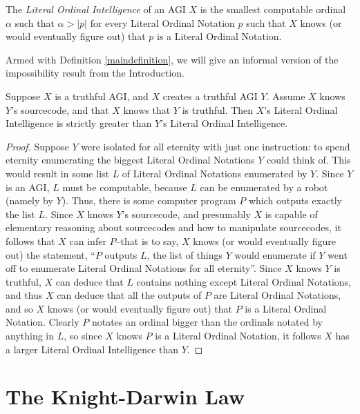 \documentclass[runningheads]{llncs}
\begin{document}
\begin{definition}
\label{maindefinition}
    The \emph{Literal Ordinal Intelligence} of an AGI $X$ is the smallest computable
    ordinal $\alpha$ such that $\alpha>|p|$ for every Literal Ordinal Notation
    $p$ such that $X$ knows (or would eventually figure out) that $p$ is a
    Literal Ordinal Notation.
\end{definition}

Armed with Definition \ref{maindefinition}, we will give an informal version of the
impossibility result from the Introduction.

\begin{theorem}
\label{maintheorem}
    Suppose $X$ is a truthful AGI, and $X$ creates a truthful AGI $Y$.
    Assume $X$ knows $Y$'s sourcecode, and that $X$ knows that $Y$ is truthful.
    Then $X$'s Literal Ordinal Intelligence is strictly greater than $Y$'s
    Literal Ordinal Intelligence.
\end{theorem}

\begin{proof}
    Suppose $Y$ were isolated for all eternity with just one instruction:
    to spend eternity enumerating the biggest Literal Ordinal Notations $Y$ could
    think of. This would result in some list $L$ of Literal Ordinal Notations
    enumerated by $Y$. Since $Y$ is an AGI, $L$ must be computable, because $L$ can
    be enumerated by a robot (namely by $Y$). Thus, there is some computer program
    $P$ which outputs exactly the list $L$. Since $X$ knows $Y$'s sourcecode,
    and presumably $X$ is capable of elementary reasoning about sourcecodes and
    how to manipulate sourcecodes, it follows that $X$ can infer $P$--that is to
    say, $X$ knows (or would eventually figure out) the statement, ``$P$ outputs
    $L$, the list of things $Y$ would enumerate if $Y$ went off to enumerate
    Literal Ordinal Notations for all eternity''. Since $X$ knows $Y$ is truthful,
    $X$ can deduce that $L$ contains nothing except Literal Ordinal Notations,
    and thus $X$ can deduce that all the outputs of $P$ are Literal Ordinal Notations,
    and so $X$ knows (or would eventually figure out) that $P$ is a Literal Ordinal Notation.
    Clearly $P$ notates an ordinal bigger than the ordinals notated by anything in $L$,
    so since $X$ knows $P$ is a Literal Ordinal Notation, it follows $X$ has a larger
    Literal Ordinal Intelligence than $Y$.
\end{proof}

\section{The Knight-Darwin Law}
\label{kdlawsection}
\end{document}
